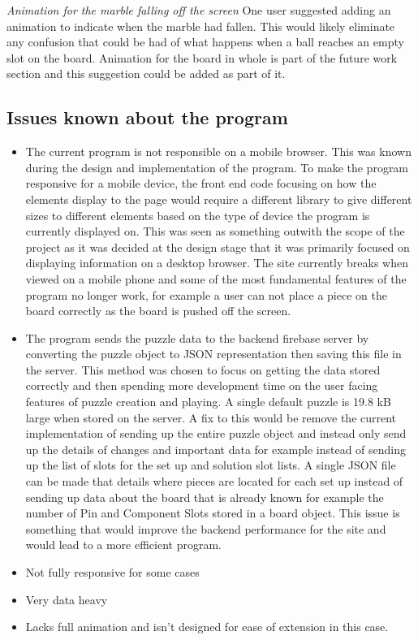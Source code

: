 \documentclass{l4proj}
\begin{document}
\emph{Animation for the marble falling off the screen}
One user suggested adding an animation to indicate when the marble had fallen. This would likely eliminate any confusion that could be had of what happens when a ball reaches an empty slot on the board. Animation for the board in whole is part of the future work section and this suggestion could be added as part of it.

\subsection{Issues known about the program}
\begin{itemize}
    \item The current program is not responsible on a mobile browser. This was known during the design and implementation of the program. To make the program responsive for a mobile device, the front end code focusing on how the elements display to the page would require a different library to give different sizes to different elements based on the type of device the program is currently displayed on. This was seen as something outwith the scope of the project as it was decided at the design stage that it was primarily focused on displaying information on a desktop browser. The site currently breaks when viewed on a mobile phone and some of the most fundamental features of the program no longer work, for example a user can not place a piece on the board correctly as the board is pushed off the screen.
    \item The program sends the puzzle data to the backend firebase server by converting the puzzle object to JSON representation then saving this file in the server. This method was chosen to focus on getting the data stored correctly and then spending more development time on the user facing features of puzzle creation and playing. A single default puzzle is 19.8 kB large when stored on the server. A fix to this would be remove the current implementation of sending up the entire puzzle object and instead only send up the details of changes and important data for example instead of sending up the list of slots for the set up and solution slot lists. A single JSON file can be made that details where pieces are located for each set up instead of sending up data about the board that is already known for example the number of Pin and Component Slots stored in a board object. This issue is something that would improve the backend performance for the site and would lead to a more efficient program. 
    \item Not fully responsive for some cases
    \item Very data heavy
    \item Lacks full animation and isn't designed for ease of extension in this case.
\end{itemize}
\end{document}
